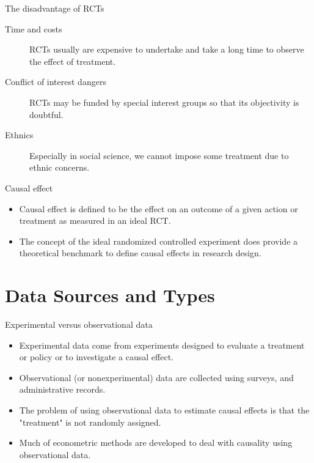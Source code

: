\documentclass[presentation]{beamer}
\begin{document}
\begin{frame}[label={sec:orgbde0448}]{The disadvantage of RCTs}
\begin{description}
\item[{Time and costs}] RCTs usually are expensive to undertake and take a
long time to observe the effect of treatment.
\item[{Conflict of interest dangers}] RCTs may be funded by special interest
groups so that its objectivity is doubtful.
\item[{Ethnics}] Especially in social science, we cannot impose some
treatment due to ethnic concerns.
\end{description}
\end{frame}


\begin{frame}[label={sec:org8e6eee4}]{Causal effect}
\begin{itemize}
\item \alert{Causal effect} is defined to be the effect on an outcome of a given
action or treatment as measured in an ideal RCT.
\item The concept of the ideal randomized controlled experiment does
provide a theoretical benchmark to define causal effects in research
design.
\end{itemize}
\end{frame}


\section{Data Sources and Types}
\label{sec:org9f7f021}
\setcounter{tocdepth}{1}
\tableofcontents[currentsection]

\begin{frame}[label={sec:org1f34248}]{Experimental versus observational data}
\begin{itemize}
\item \alert{Experimental data} come from experiments designed to evaluate a
treatment or policy or to investigate a causal effect.
\item \alert{Observational (or nonexperimental) data} are collected using
surveys, and administrative records.
\item The problem of using observational data to estimate causal effects is
that the "treatment" is not randomly assigned.
\item Much of econometric methods are developed to deal with
causality using observational data.
\end{itemize}
\end{frame}
\end{document}
